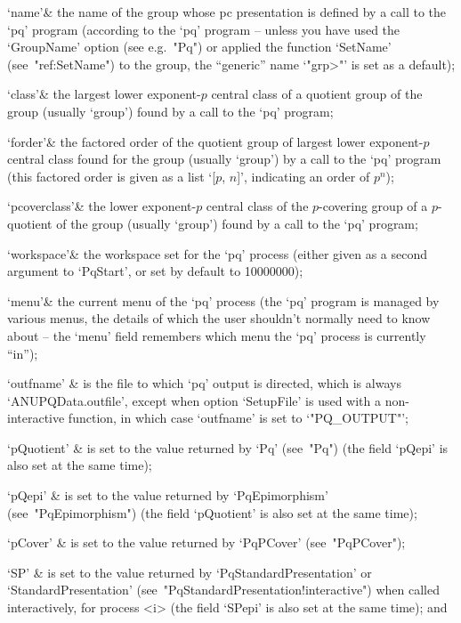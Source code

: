 \quad`name'& the name of the group whose pc presentation is defined by  a
call to the `pq' program (according to the `pq' program -- unless you  have
used the `GroupName' option  (see  e.g.~"Pq")  or  applied  the  function
`SetName'  (see~"ref:SetName")  to  the  group,  the   ``generic''   name
`"\<grp>"' is set as a default);

\quad`class'& the largest lower exponent-$p$ central class of a  quotient
group of the group (usually `group') found by a call to the `pq' program;

\quad`forder'& the factored order of the quotient group of largest  lower
exponent-$p$ central class found for the group  (usually  `group')  by  a
call to the `pq' program (this factored order is given as  a  list  `[$p$,
$n$]', indicating an order of $p^n$);

\quad`pcoverclass'&  the  lower  exponent-$p$  central   class   of   the
$p$-covering group of a $p$-quotient of the group (usually `group') found
by a call to the `pq' program;

\quad`workspace'& the workspace set for the `pq' process (either given as
a second argument to `PqStart', or set by default to 10000000);

\quad`menu'& the current menu of the `pq' process  (the  `pq'  program  is
managed by various  menus,  the  details  of  which  the  user  shouldn't
normally need to know about -- the `menu' field remembers which menu  the
`pq' process is currently ``in'');

\quad`outfname' & is the file to which `pq' output is directed, which  is
always `ANUPQData.outfile', except when option `SetupFile' is used with a
non-interactive  function,  in  which   case   `outfname'   is   set   to
`"PQ_OUTPUT"';

\quad`pQuotient' & is set to the value returned by `Pq'  (see~"Pq")  (the
field `pQepi' is also set at the same time);

\quad`pQepi'  &  is  set  to  the  value  returned   by   `PqEpimorphism'
(see~"PqEpimorphism") (the field `pQuotient' is  also  set  at  the  same
time);

\quad`pCover'  &  is  set   to   the   value   returned   by   `PqPCover'
(see~"PqPCover");

\quad`SP' & is set to the value returned by  `PqStandardPresentation'  or
`StandardPresentation'  (see~"PqStandardPresentation!interactive")   when
called interactively, for process <i> (the field `SPepi' is also  set  at
the same time); and

